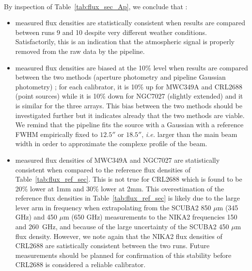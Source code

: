 \\

By inspection of Table~\ref{tab:flux_sec_Ap}, we conclude that :

\begin{itemize}
  
\item measured flux densities are statistically consistent when results are compared between runs 9 and 10 despite very different weather conditions.
Satisfactorily, this is an indication that the atmospheric signal is properly removed from the raw data by the pipeline.   


\item   measured flux densities are biased at the  10\% level when results are compared between the two methods
(aperture photometry and pipeline Gaussian photometry) ;
for each calibrator,  it is 10\% up for MWC349A and CRL2688 (point sources) while it is 10\% down
for NGC7027 (slightly extended) and it is similar for the three arrays.
This bias between the two methods should be investigated further but it indicates
already that the two methods are viable. We remind that the
pipeline fits the source with a Gaussian with a reference FWHM empirically fixed to $12.5''$ or $18.5''$, {\it i.e.} larger than the main beam width
in order to approximate the complexe profile of the beam.  

\item measured flux densities of MWC349A and NGC7027 are statistically consistent when compared to the reference flux densities of
Table~\ref{tab:flux_ref_sec}. This is not true
     for CRL2688 which is found to be 20\% lower at 1mm and 30\% lower at 2mm. This overestimation of the reference flux densities
      in Table~\ref{tab:flux_ref_sec} is likely due to the large lever arm in frequency when extrapolating from
      the SCUBA2 850 $\mu$m (345 GHz) and 450 $\mu$m (650 GHz) measurements to the NIKA2 frequencies 150 and 260~GHz,
      and because of the large uncertainty of  the SCUBA2 450 $\mu$m flux density.
      However, we note again that the NIKA2 flux densities of CRL2688 are satistically consistent between the two runs.
      Future measurements should be planned
      for confirmation of this stability before CRL2688 is considered a reliable calibrator.

\end{itemize}

